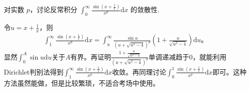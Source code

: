 \documentclass[../../main.tex]{subfiles}%
\begin{document}
\begin{example}
对实数 \(p\)，讨论反常积分 \(\int_0^{\infty}{\frac{\sin \left( x+\frac{1}{x} \right)}{x^p}\mathrm{d}x}\) 的敛散性.
\end{example}
\begin{remark}
令\(u=x+\frac{1}{x}\)，则
\begin{align*}
\int_1^{\infty}{\frac{\sin \left( x+\frac{1}{x} \right)}{x^p}\mathrm{d}x}=\int_u^{\infty}{\frac{\sin u}{\left( u+\sqrt{u^2-4} \right) ^p}\left( 1+\frac{u}{\sqrt{u^2-4}} \right) \mathrm{d}u}。
\end{align*}
显然\(\int_0^A{\sin u\mathrm{d}u}\)关于\(A\)有界。再证明\(\frac{1+\frac{u}{\sqrt{u^2-4}}}{\left( u+\sqrt{u^2-4} \right) ^p}\)单调递减趋于0，就能利用Dirichlet判别法得到\(\int_1^{\infty}{\frac{\sin \left( x+\frac{1}{x} \right)}{x^p}\mathrm{d}x}\)收敛。再同理讨论\(\int_0^1{\frac{\sin \left( x+\frac{1}{x} \right)}{x^p}\mathrm{d}x}\)即可。这种方法虽然能做，但是比较繁琐，不适合考场中使用。
\end{remark}
\end{document}
